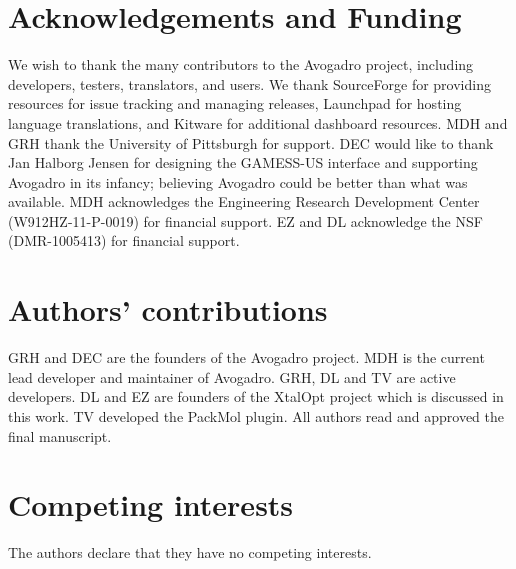 \documentclass[10pt]{bmc_article}
\newenvironment{bmcformat}{\begin{raggedright}
  \baselineskip20pt\sloppy\setboolean{publ}{false}}{\end{raggedright}
  \baselineskip20pt\sloppy}
\begin{document}
\begin{bmcformat}
\section*{Acknowledgements and Funding}

We wish to thank the many contributors to the Avogadro project,
including developers, testers, translators, and users. We thank
SourceForge for providing resources for issue tracking and managing
releases, Launchpad for hosting language translations, and Kitware for
additional dashboard resources. MDH and GRH thank the University of
Pittsburgh for support. DEC would like to thank Jan Halborg Jensen for
designing the GAMESS-US interface and supporting Avogadro in its
infancy; believing Avogadro could be better than what was available.
MDH acknowledges the Engineering Research Development Center (W912HZ-11-P-0019)
for financial support. EZ and DL acknowledge the NSF (DMR-1005413) for financial
support.

\section*{Authors' contributions}
GRH and DEC are the founders of the Avogadro project. MDH is the
current lead developer and maintainer of Avogadro. GRH, DL and TV are
active developers. DL and EZ are founders of the XtalOpt project which
is discussed in this work. TV developed the PackMol plugin. All
authors read and approved the final manuscript.

\section*{Competing interests}

The authors declare that they have no competing interests.



\end{bmcformat}
\end{document}
